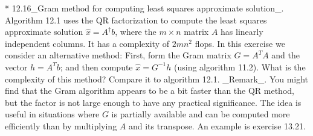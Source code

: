 * 12.16_Gram method for computing least squares approximate solution_. Algorithm 12.1 uses the QR factorization to compute the least squares approximate solution \(\hat{x}=A^{\dagger}b\), where the \(m\times n\) matrix \(A\) has linearly independent columns. It has a complexity of \(2mn^{2}\) flops. In this exercise we consider an alternative method: First, form the Gram matrix \(G=A^{T}A\) and the vector \(h=A^{T}b\); and then compute \(\hat{x}=G^{-1}h\) (using algorithm 11.2). What is the complexity of this method? Compare it to algorithm 12.1. _Remark_. You might find that the Gram algorithm appears to be a bit faster than the QR method, but the factor is not large enough to have any practical significance. The idea is useful in situations where \(G\) is partially available and can be computed more efficiently than by multiplying \(A\) and its transpose. An example is exercise 13.21.

 